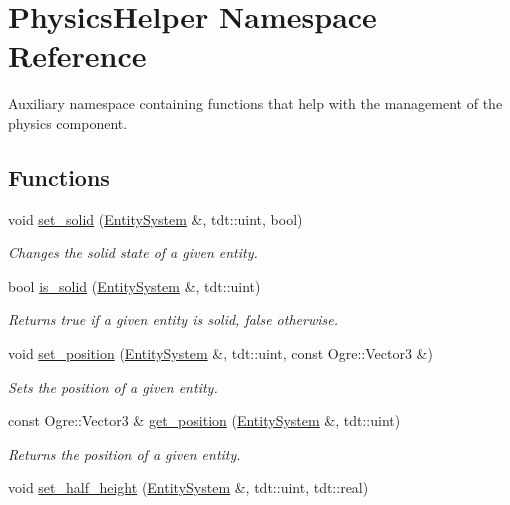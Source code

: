 \hypertarget{namespace_physics_helper}{}\section{Physics\+Helper Namespace Reference}
\label{namespace_physics_helper}


Auxiliary namespace containing functions that help with the management of the physics component.  


\subsection*{Functions}
\begin{DoxyCompactItemize}
\item 
void \hyperlink{namespace_physics_helper_ac7b2843c00462968c9f5fcf010d0f838}{set\+\_\+solid} (\hyperlink{class_entity_system}{Entity\+System} \&, tdt\+::uint, bool)
\begin{DoxyCompactList}\small\item\em Changes the solid state of a given entity. \end{DoxyCompactList}\item 
bool \hyperlink{namespace_physics_helper_a5bd7a98d8eac3b64c9d6592eb74b9bb6}{is\+\_\+solid} (\hyperlink{class_entity_system}{Entity\+System} \&, tdt\+::uint)
\begin{DoxyCompactList}\small\item\em Returns true if a given entity is solid, false otherwise. \end{DoxyCompactList}\item 
void \hyperlink{namespace_physics_helper_a931ac2a0cebb6abefd027eb2c2b7def0}{set\+\_\+position} (\hyperlink{class_entity_system}{Entity\+System} \&, tdt\+::uint, const Ogre\+::\+Vector3 \&)
\begin{DoxyCompactList}\small\item\em Sets the position of a given entity. \end{DoxyCompactList}\item 
const Ogre\+::\+Vector3 \& \hyperlink{namespace_physics_helper_a79d0f5020624c761028cd083b664b61a}{get\+\_\+position} (\hyperlink{class_entity_system}{Entity\+System} \&, tdt\+::uint)
\begin{DoxyCompactList}\small\item\em Returns the position of a given entity. \end{DoxyCompactList}\item 
void \hyperlink{namespace_physics_helper_a50a726c54c9c958f7f5cead892e661cb}{set\+\_\+half\+\_\+height} (\hyperlink{class_entity_system}{Entity\+System} \&, tdt\+::uint, tdt\+::real)

\end{DoxyCompactItemize}
